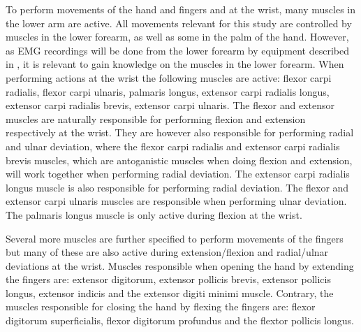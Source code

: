 

To perform movements of the hand and fingers and at the wrist, many muscles in the lower arm are active. All movements relevant for this study are controlled by muscles in the lower forearm, as well as some in the palm of the hand. However, as EMG recordings will be done from the lower forearm by equipment described in , it is relevant to gain knowledge on the muscles in the lower forearm. 
When performing actions at the wrist the following muscles are active: flexor carpi radialis, flexor carpi ulnaris, palmaris longus, extensor carpi radialis longus, extensor carpi radialis brevis, extensor carpi ulnaris. The flexor and extensor muscles are naturally responsible for performing flexion and extension respectively at the wrist. They are however also responsible for performing radial and ulnar deviation, where the flexor carpi radialis and extensor carpi radialis brevis muscles, which are antoganistic muscles when doing flexion and extension, will work together when performing radial deviation. The extensor carpi radialis longus muscle is also responsible for performing radial deviation. The flexor and extensor carpi ulnaris muscles are responsible when performing ulnar deviation. The palmaris longus muscle is only active during flexion at the wrist. \cite{Martini2012}

Several more muscles are further specified to perform movements of the fingers but many of these are also active during extension/flexion and radial/ulnar deviations at the wrist. Muscles responsible when opening the hand by extending the fingers are: extensor digitorum, extensor pollicis brevis, extensor pollicis longus, extensor indicis and the extensor digiti minimi muscle. Contrary, the muscles responsible for closing the hand by flexing the fingers are: flexor digitorum superficialis, flexor digitorum profundus and the flextor pollicis longus. \cite{Martini2012}







